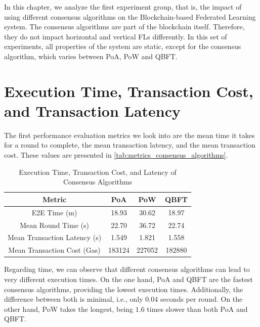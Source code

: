 In this chapter, we analyze the first experiment group, that is, the impact of using different consensus algorithms on the Blockchain-based Federated Learning system. The consensus algorithms are part of the blockchain itself. Therefore, they do not impact horizontal and vertical FLs differently. In this set of experiments, all properties of the system are static, except for the consensus algorithm, which varies between PoA, PoW and QBFT.

\section{Execution Time, Transaction Cost, and Transaction Latency}

The first performance evaluation metrics we look into are the mean time it takes for a round to complete, the mean transaction latency, and the mean transaction cost. These values are presented in \autoref{tab:metrics_consensus_algorithms}.

\begin{table}[!ht]
\centering
\begin{tabular}{c|c|c|c} \hline \hline
Metric                              & PoA    & PoW    & QBFT   \\ \hline \hline
E2E Time (m)            & 18.93  & 30.62  & 18.97  \\ \hline
Mean Round Time (s)             & 22.70  & 36.72  & 22.74  \\ \hline
Mean Transaction Latency (s)    & 1.549  & 1.821  & 1.558  \\ \hline
Mean Transaction Cost (Gas)     & 183124 & 227052 & 182880 \\ \hline
\end{tabular}
\caption{Execution Time, Transaction Cost, and Latency of Consensus Algorithms}
\label{tab:metrics_consensus_algorithms}
\end{table}

Regarding time, we can observe that different consensus algorithms can lead to very different execution times. On the one hand, PoA and QBFT are the fastest consensus algorithms, providing the lowest execution times. Additionally, the difference between both is minimal, i.e., only $0.04$ seconds per round. On the other hand, PoW takes the longest, being $1.6$ times slower than both PoA and QBFT.

